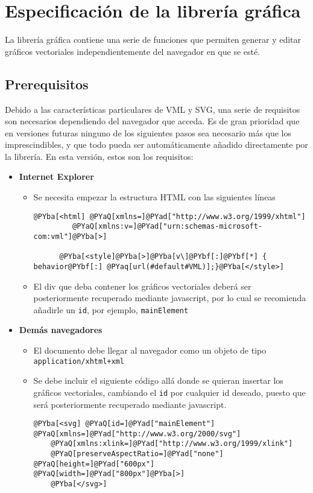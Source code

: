 \section{Especificación de la librería gráfica} %
\label{sec:especificación_de_la_librería_gráfica}

La librería gráfica contiene una serie de funciones que permiten generar y editar gráficos vectoriales independientemente del navegador en que se esté.

\subsection{Prerequisitos} %
\label{sub:prerrequisitos}

Debido a las características particulares de VML y SVG, una serie de requisitos son necesarios dependiendo del navegador que acceda. Es de gran prioridad que en versiones futuras ninguno de los siguientes pasos sea necesario más que los imprescindibles, y que todo pueda ser automáticamente añadido directamente por la librería. En esta versión, estos son los requisitos:

\begin{itemize}
  \item \textbf{Internet Explorer}
  \begin{itemize}
    \item Se necesita empezar la estructura HTML con las siguientes líneas
      \begin{Verbatim}[commandchars=@\[\]]
      @PYba[<html] @PYaQ[xmlns=]@PYad["http://www.w3.org/1999/xhtml"] 
         @PYaQ[xmlns:v=]@PYad["urn:schemas-microsoft-com:vml"]@PYba[>]

      @PYba[<style]@PYba[>]@PYba[v\]@PYbf[:]@PYbf[*] { behavior@PYbf[:] @PYaq[url(#default#VML)];}@PYba[</style>]
      \end{Verbatim}
    \item El div que deba contener los gráficos vectoriales deberá ser posteriormente recuperado mediante javascript, por lo cual se recomienda añadirle un \texttt{id}, por ejemplo, \texttt{mainElement}
  \end{itemize}
  \item \textbf{Demás navegadores}
  \begin{itemize}
    \item El documento debe llegar al navegador como un objeto de tipo \texttt{application/xhtml+xml}
    \item Se debe incluir el siguiente código allá donde se quieran insertar los gráficos vectoriales, cambiando el \texttt{id} por cualquier id deseado, puesto que será posteriormente recuperado mediante javascript.
    \begin{Verbatim}[commandchars=@\[\]]
    @PYba[<svg] @PYaQ[id=]@PYad["mainElement"] @PYaQ[xmlns=]@PYad["http://www.w3.org/2000/svg"]
    @PYaQ[xmlns:xlink=]@PYad["http://www.w3.org/1999/xlink"]
    @PYaQ[preserveAspectRatio=]@PYad["none"] @PYaQ[height=]@PYad["600px"] @PYaQ[width=]@PYad["800px"]@PYba[>]
    @PYba[</svg>]
    \end{Verbatim}
  \end{itemize}
\end{itemize}

